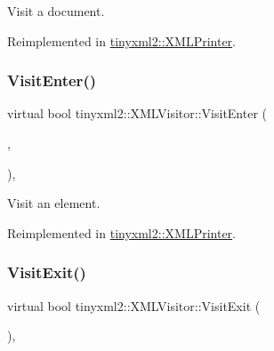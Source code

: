 Visit a document. 



Reimplemented in \mbox{\hyperlink{classtinyxml2_1_1_x_m_l_printer_a9aa1de11a55a07db55a90fde37d7afad}{tinyxml2\+::\+X\+M\+L\+Printer}}.

\mbox{\label{classtinyxml2_1_1_x_m_l_visitor_af97980a17dd4e37448b181f5ddfa92b5}} 
\subsubsection{\texorpdfstring{Visit\+Enter()}{VisitEnter()}\hspace{0.1cm}{\footnotesize\ttfamily [2/2]}}
{\footnotesize\ttfamily virtual bool tinyxml2\+::\+X\+M\+L\+Visitor\+::\+Visit\+Enter (\begin{DoxyParamCaption}\item[{const \mbox{\hyperlink{classtinyxml2_1_1_x_m_l_element}{X\+M\+L\+Element}} \&}]{,  }\item[{const \mbox{\hyperlink{classtinyxml2_1_1_x_m_l_attribute}{X\+M\+L\+Attribute}} $\ast$}]{ }\end{DoxyParamCaption})\hspace{0.3cm}{\ttfamily [inline]}, {\ttfamily [virtual]}}



Visit an element. 



Reimplemented in \mbox{\hyperlink{classtinyxml2_1_1_x_m_l_printer_a169b2509d8eabb70811b2bb8cfd1f5d1}{tinyxml2\+::\+X\+M\+L\+Printer}}.

\mbox{\label{classtinyxml2_1_1_x_m_l_visitor_a170e9989cd046ba904f302d087e07086}} 
\subsubsection{\texorpdfstring{Visit\+Exit()}{VisitExit()}\hspace{0.1cm}{\footnotesize\ttfamily [1/2]}}
{\footnotesize\ttfamily virtual bool tinyxml2\+::\+X\+M\+L\+Visitor\+::\+Visit\+Exit (\begin{DoxyParamCaption}\item[{const \mbox{\hyperlink{classtinyxml2_1_1_x_m_l_document}{X\+M\+L\+Document}} \&}]{ }\end{DoxyParamCaption})\hspace{0.3cm}{\ttfamily [inline]}, {\ttfamily [virtual]}}



